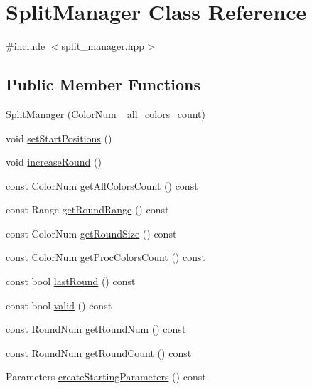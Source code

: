\hypertarget{class_split_manager}{\section{Split\-Manager Class Reference}
\label{class_split_manager}
}


{\ttfamily \#include $<$split\-\_\-manager.\-hpp$>$}

\subsection*{Public Member Functions}
\begin{DoxyCompactItemize}
\item 
\hyperlink{class_split_manager_a43be4ad8687d41b4d5b39930f5647fd3}{Split\-Manager} (Color\-Num \-\_\-all\-\_\-colors\-\_\-count)
\item 
void \hyperlink{class_split_manager_aefbe08dc3d1ffc189c71b16ef9d29a2c}{set\-Start\-Positions} ()
\item 
void \hyperlink{class_split_manager_a59d545f8e492f00c4dfc37ac5b2f5fa0}{increase\-Round} ()
\item 
const Color\-Num \hyperlink{class_split_manager_a29b0ff3eeafec41aa6e5a69598f53e0c}{get\-All\-Colors\-Count} () const 
\item 
const Range \hyperlink{class_split_manager_a22b8aa231bc5169b2239427fd6a65a50}{get\-Round\-Range} () const 
\item 
const Color\-Num \hyperlink{class_split_manager_a0201cbbb62e2e0a545ff14fd2ec3546e}{get\-Round\-Size} () const 
\item 
const Color\-Num \hyperlink{class_split_manager_a6a056c67fc1b475e6ad79a55965b981e}{get\-Proc\-Colors\-Count} () const 
\item 
const bool \hyperlink{class_split_manager_a4a1a01702396ccfd7e268eed9967eea1}{last\-Round} () const 
\item 
const bool \hyperlink{class_split_manager_a8aa618ec1490e8cea24ae1d9f91e9334}{valid} () const 
\item 
const Round\-Num \hyperlink{class_split_manager_a85c16ba80eb0441d0dae727485ab5d4d}{get\-Round\-Num} () const 
\item 
const Round\-Num \hyperlink{class_split_manager_a8ffd88581974f941817f16d892046da4}{get\-Round\-Count} () const 
\item 
Parameters \hyperlink{class_split_manager_ab27835493c0bd777569d8b1528667abf}{create\-Starting\-Parameters} () const 
\end{DoxyCompactItemize}


